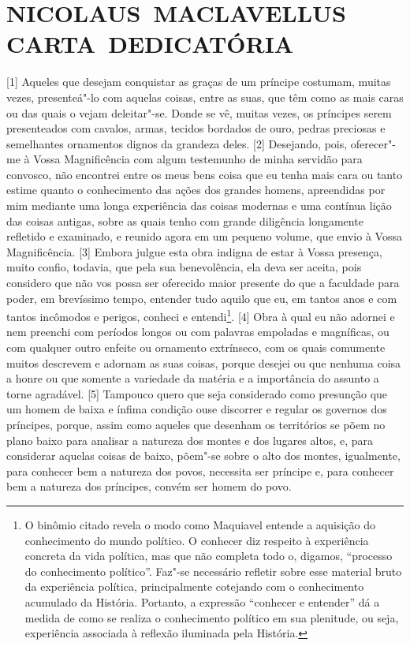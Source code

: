 \setcounter{secnumdepth}{-2}
\setcounter{paragraph}{0}

\section*{NICOLAUS~MACLAVELLUS \break{}CARTA~DEDICATÓRIA}

{[}1{]} Aqueles que desejam conquistar as graças de um príncipe
costumam, muitas vezes, presenteá"-lo com aquelas coisas, entre as suas,
que têm como as mais caras ou das quais o vejam deleitar"-se. Donde se
vê, muitas vezes, os príncipes serem presenteados com cavalos, armas,
tecidos bordados de ouro, pedras preciosas e semelhantes ornamentos
dignos da grandeza deles. {[}2{]} Desejando, pois, oferecer"-me à Vossa
Magnificência com algum testemunho de minha servidão para convosco, não
encontrei entre os meus bens coisa que eu tenha mais cara ou tanto
estime quanto o conhecimento das ações dos grandes homens, apreendidas
por mim mediante uma longa experiência das coisas modernas e uma
contínua lição das coisas antigas, sobre as quais tenho com grande
diligência longamente refletido e examinado, e reunido agora em um
pequeno volume, que envio à Vossa Magnificência. {[}3{]} Embora julgue
esta obra indigna de estar à Vossa presença, muito confio, todavia, que
pela sua benevolência, ela deva ser aceita, pois considero que não vos
possa ser oferecido maior presente do que a faculdade para poder, em
brevíssimo tempo, entender tudo aquilo que eu, em tantos anos e com
tantos incômodos e perigos, conheci e entendi\footnote{O binômio citado
  revela o modo como Maquiavel entende a aquisição do conhecimento do
  mundo político. O conhecer diz respeito à experiência concreta da vida
  política, mas que não completa todo o, digamos, ``processo do
  conhecimento político''. Faz"-se necessário refletir sobre esse
  material bruto da experiência política, principalmente cotejando com o
  conhecimento acumulado da História. Portanto, a expressão ``conhecer e
  entender'' dá a medida de como se realiza o conhecimento político em
  sua plenitude, ou seja, experiência associada à reflexão iluminada
  pela História.}. {[}4{]} Obra à qual eu não adornei e nem preenchi com
períodos longos ou com palavras empoladas e magníficas, ou com qualquer
outro enfeite ou ornamento extrínseco, com os quais comumente muitos
descrevem e adornam as suas coisas, porque desejei ou que nenhuma coisa
a honre ou que somente a variedade da matéria e a importância do assunto
a torne agradável. {[}5{]} Tampouco quero que seja considerado como
presunção que um homem de baixa e ínfima condição ouse discorrer e
regular os governos dos príncipes, porque, assim como aqueles que
desenham os territórios se põem no plano baixo para analisar a natureza
dos montes e dos lugares altos, e, para considerar aquelas coisas de
baixo, põem"-se sobre o alto dos montes, igualmente, para conhecer bem a
natureza dos povos, necessita ser príncipe e, para conhecer bem a
natureza dos príncipes, convém ser homem do povo.

